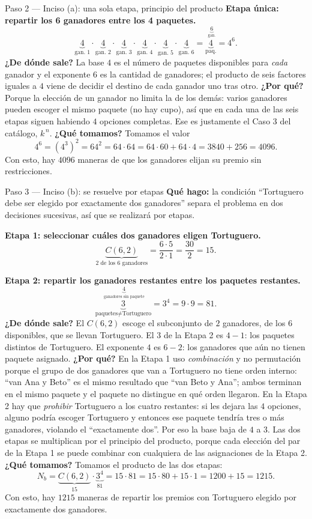 \documentclass[11pt]{article}
\begin{document}
\begin{sol}
\begin{paso}{Paso 2 --- Inciso (a): una sola etapa, principio del producto}
\medskip
\textbf{Etapa única: repartir los 6 ganadores entre los 4 paquetes.}
\[
\underbrace{4}_{\text{gan. }1}\cdot\underbrace{4}_{\text{gan. }2}\cdot\underbrace{4}_{\text{gan. }3}\cdot\underbrace{4}_{\text{gan. }4}\cdot\underbrace{4}_{\text{gan. }5}\cdot\underbrace{4}_{\text{gan. }6}
=\underbrace{4}_{\text{paq.}}^{\;\underbrace{6}_{\text{gan.}}}=4^6 .
\]
\textbf{¿De dónde sale?} La base $4$ es el número de paquetes disponibles para \emph{cada} ganador y el exponente $6$ es la cantidad de ganadores; el producto de seis factores iguales a $4$ viene de decidir el destino de cada ganador uno tras otro.
\textbf{¿Por qué?} Porque la elección de un ganador no limita la de los demás: varios ganadores pueden escoger el mismo paquete (no hay cupo), así que en cada una de las seis etapas siguen habiendo $4$ opciones completas. Ese es justamente el Caso 3 del catálogo, $k^{\,n}$.
\textbf{¿Qué tomamos?} Tomamos el valor
\[
4^6=(4^3)^2=64^2=64\cdot 64=64\cdot 60+64\cdot 4=3840+256=4096 .
\]
Con esto, hay $4096$ maneras de que los ganadores elijan su premio sin restricciones.
\end{paso}

\begin{paso}{Paso 3 --- Inciso (b): se resuelve por etapas}
\textbf{Qué hago:} la condición ``Tortuguero debe ser elegido por exactamente dos ganadores'' separa el problema en dos decisiones sucesivas, así que se realizará por etapas.

\medskip
\textbf{Etapa 1: seleccionar cuáles dos ganadores eligen Tortuguero.}
\[
\underbrace{C(6,2)}_{\text{2 de los 6 ganadores}}=\frac{6\cdot 5}{2\cdot 1}=\frac{30}{2}=15 .
\]

\medskip
\textbf{Etapa 2: repartir los ganadores restantes entre los paquetes restantes.}
\[
\underbrace{3}_{\text{paquetes} \ne \text{Tortuguero}}^{\;\underbrace{4}_{\text{ganadores sin paquete}}}=3^4=9\cdot 9=81 .
\]
\textbf{¿De dónde sale?} El $C(6,2)$ escoge el subconjunto de $2$ ganadores, de los $6$ disponibles, que se llevan Tortuguero. El $3$ de la Etapa 2 es $4-1$: los paquetes distintos de Tortuguero. El exponente $4$ es $6-2$: los ganadores que aún no tienen paquete asignado.
\textbf{¿Por qué?} En la Etapa 1 uso \emph{combinación} y no permutación porque el grupo de dos ganadores que van a Tortuguero no tiene orden interno: ``van Ana y Beto'' es el mismo resultado que ``van Beto y Ana''; ambos terminan en el mismo paquete y el paquete no distingue en qué orden llegaron. En la Etapa 2 hay que \emph{prohibir} Tortuguero a los cuatro restantes: si les dejara las $4$ opciones, alguno podría escoger Tortuguero y entonces ese paquete tendría tres o más ganadores, violando el ``exactamente dos''. Por eso la base baja de $4$ a $3$. Las dos etapas se multiplican por el principio del producto, porque cada elección del par de la Etapa 1 se puede combinar con cualquiera de las asignaciones de la Etapa 2.
\textbf{¿Qué tomamos?} Tomamos el producto de las dos etapas:
\[
N_b=\underbrace{C(6,2)}_{15}\cdot\underbrace{3^4}_{81}=15\cdot 81=15\cdot 80+15\cdot 1=1200+15=1215 .
\]
Con esto, hay $1215$ maneras de repartir los premios con Tortuguero elegido por exactamente dos ganadores.
\end{paso}


\end{sol}
\end{document}
